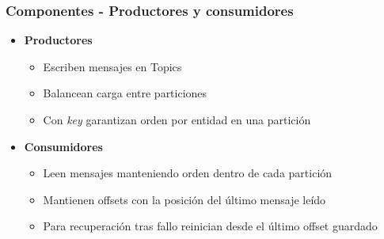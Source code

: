 \documentclass[aspectratio=169]{beamer}
\begin{document}
\begin{frame}\frametitle{Componentes - Productores y consumidores}
\begin{itemize}
  \item \textbf{Productores}
  \begin{itemize}
    \item Escriben mensajes en Topics
    \item Balancean carga entre particiones
    \item Con \textit{key} garantizan orden por entidad en una partición
  \end{itemize}

  \vspace{1em}

  \item \textbf{Consumidores}
  \begin{itemize}
    \item Leen mensajes manteniendo orden dentro de cada partición
    \item Mantienen offsets con la posición del último mensaje leído
    \item Para recuperación tras fallo reinician desde el último offset guardado
  \end{itemize}
\end{itemize}
\end{frame}
\end{document}

